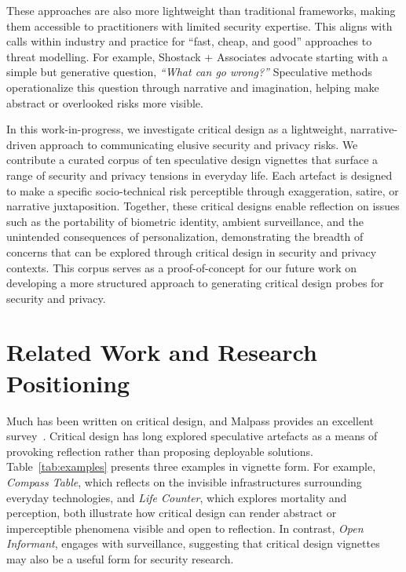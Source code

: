 These approaches are also more lightweight than traditional frameworks, making them accessible to practitioners with limited security expertise. This aligns with calls within industry and practice for ``fast, cheap, and good'' approaches to threat modelling. For example, Shostack + Associates \cite{shostack_fast_cheap_good} advocate starting with a simple but generative question, \textit{``What can go wrong?''}  Speculative methods operationalize this question through narrative and imagination, helping make abstract or overlooked risks more visible.

In this work-in-progress, we investigate critical design as a lightweight, narrative-driven approach to communicating elusive security and privacy risks. We contribute a curated corpus of ten speculative design vignettes that surface a range of security and privacy tensions in everyday life. Each artefact is designed to make a specific socio-technical risk perceptible through exaggeration, satire, or narrative juxtaposition. Together, these critical designs enable reflection on issues such as the portability of biometric identity, ambient surveillance, and the unintended consequences of personalization, demonstrating the breadth of concerns that can be explored through critical design in security and privacy contexts. This corpus serves as a proof-of-concept for our future work on developing a more structured approach to generating critical design probes for security and privacy.


\section{Related Work and Research Positioning}

Much has been written on critical design, and Malpass provides an excellent survey~\cite{Mal17}. Critical design has long explored speculative artefacts as a means of provoking reflection rather than proposing deployable solutions. Table~\ref{tab:examples} presents three examples in vignette form. For example, \textit{Compass Table}, which reflects on the invisible infrastructures surrounding everyday technologies, and \textit{Life Counter}, which explores mortality and perception, both illustrate how critical design can render abstract or imperceptible phenomena visible and open to reflection. In contrast, \textit{Open Informant}, engages with surveillance, suggesting that critical design vignettes may also be a useful form for security research. 


